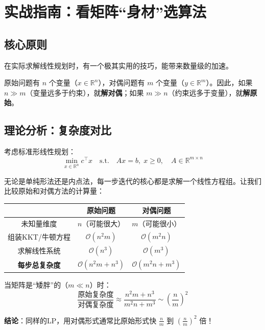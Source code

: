 \section{实战指南：看矩阵“身材”选算法}

\subsection{核心原则}

在实际求解线性规划时，有一个极其实用的技巧，能带来数量级的加速。

\begin{center}
\end{center}

原始问题有 $n$ 个变量（$x \in \mathbb{R}^n$），对偶问题有 $m$ 个变量（$y \in \mathbb{R}^m$）。因此，如果 $n \gg m$（变量远多于约束），就\textbf{解对偶}；如果 $m \gg n$（约束远多于变量），就\textbf{解原始}。

\subsection{理论分析：复杂度对比}

考虑标准形线性规划：
\[
\min_{x \in \mathbb{R}^n} c^\top x \quad \text{s.t.} \quad Ax = b, \; x \geq 0, \quad A \in \mathbb{R}^{m \times n}
\]

无论是单纯形法还是内点法，每一步迭代的核心都是求解一个线性方程组。让我们比较原始和对偶方法的计算量：

\begin{center}
\renewcommand{\arraystretch}{1.4}
\begin{tabular}{c|c|c}
\toprule
& \textbf{原始问题} & \textbf{对偶问题} \\
\midrule
未知量维度 & $n$（可能很大） & $m$（可能很小） \\
\midrule
组装KKT/牛顿方程 & $\mathcal{O}(n^2 m)$ & $\mathcal{O}(m^2 n)$ \\
\midrule
求解线性系统 & $\mathcal{O}(n^3)$ & $\mathcal{O}(m^3)$ \\
\midrule
\textbf{每步总复杂度} & $\mathcal{O}(n^2 m + n^3)$ & $\mathcal{O}(m^2 n + m^3)$ \\
\bottomrule
\end{tabular}
\end{center}

\begin{keyformula}[title=复杂度比值]
当矩阵是“矮胖”的（$m \ll n$）时：
\[
\frac{\text{原始复杂度}}{\text{对偶复杂度}} \approx \frac{n^2 m + n^3}{m^2 n + m^3} \sim \left(\frac{n}{m}\right)^2
\]

\textbf{结论}：同样的LP，用对偶形式通常比原始形式快 $\frac{n}{m}$ 到 $\left(\frac{n}{m}\right)^2$ 倍！
\end{keyformula}

